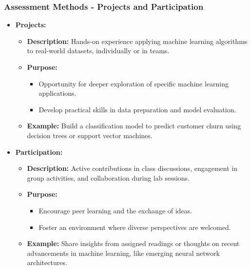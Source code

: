 \documentclass[aspectratio=169]{beamer}
\begin{document}
\begin{frame}[fragile]
    \frametitle{Assessment Methods - Projects and Participation}
    \begin{itemize}
        \item \textbf{Projects:}
        \begin{itemize}
            \item \textbf{Description:} Hands-on experience applying machine learning algorithms to real-world datasets, individually or in teams.
            \item \textbf{Purpose:}
            \begin{itemize}
                \item Opportunity for deeper exploration of specific machine learning applications.
                \item Develop practical skills in data preparation and model evaluation.
            \end{itemize}
            \item \textbf{Example:} Build a classification model to predict customer churn using decision trees or support vector machines.
        \end{itemize}
        
        \item \textbf{Participation:}
        \begin{itemize}
            \item \textbf{Description:} Active contributions in class discussions, engagement in group activities, and collaboration during lab sessions.
            \item \textbf{Purpose:}
            \begin{itemize}
                \item Encourage peer learning and the exchange of ideas.
                \item Foster an environment where diverse perspectives are welcomed.
            \end{itemize}
            \item \textbf{Example:} Share insights from assigned readings or thoughts on recent advancements in machine learning, like emerging neural network architectures.
        \end{itemize}
    \end{itemize}
\end{frame}
\end{document}

